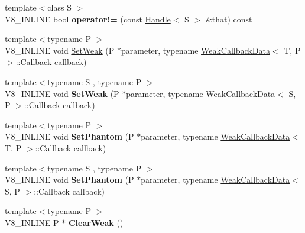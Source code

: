 \begin{DoxyCompactItemize}
\item 
\hypertarget{classv8_1_1PersistentBase_acc30195c1ee4e1f801cab267e6855fd3}{}{\footnotesize template$<$class S $>$ }\\V8\+\_\+\+I\+N\+L\+I\+N\+E bool {\bfseries operator!=} (const \hyperlink{classv8_1_1Handle}{Handle}$<$ S $>$ \&that) const \label{classv8_1_1PersistentBase_acc30195c1ee4e1f801cab267e6855fd3}

\item 
{\footnotesize template$<$typename P $>$ }\\V8\+\_\+\+I\+N\+L\+I\+N\+E void \hyperlink{classv8_1_1PersistentBase_a1fb3293eff7a66068de13d152f73f308}{Set\+Weak} (P $\ast$parameter, typename \hyperlink{classv8_1_1WeakCallbackData}{Weak\+Callback\+Data}$<$ T, P $>$\+::Callback callback)
\item 
\hypertarget{classv8_1_1PersistentBase_a297e0c410e9496318187853e07bf8406}{}{\footnotesize template$<$typename S , typename P $>$ }\\V8\+\_\+\+I\+N\+L\+I\+N\+E void {\bfseries Set\+Weak} (P $\ast$parameter, typename \hyperlink{classv8_1_1WeakCallbackData}{Weak\+Callback\+Data}$<$ S, P $>$\+::Callback callback)\label{classv8_1_1PersistentBase_a297e0c410e9496318187853e07bf8406}

\item 
\hypertarget{classv8_1_1PersistentBase_ab30d2f1468123f44bc9945c4f1743dbf}{}{\footnotesize template$<$typename P $>$ }\\V8\+\_\+\+I\+N\+L\+I\+N\+E void {\bfseries Set\+Phantom} (P $\ast$parameter, typename \hyperlink{classv8_1_1WeakCallbackData}{Weak\+Callback\+Data}$<$ T, P $>$\+::Callback callback)\label{classv8_1_1PersistentBase_ab30d2f1468123f44bc9945c4f1743dbf}

\item 
\hypertarget{classv8_1_1PersistentBase_a70f75731cb947f2a7c5c33fb2aef5618}{}{\footnotesize template$<$typename S , typename P $>$ }\\V8\+\_\+\+I\+N\+L\+I\+N\+E void {\bfseries Set\+Phantom} (P $\ast$parameter, typename \hyperlink{classv8_1_1WeakCallbackData}{Weak\+Callback\+Data}$<$ S, P $>$\+::Callback callback)\label{classv8_1_1PersistentBase_a70f75731cb947f2a7c5c33fb2aef5618}

\item 
\hypertarget{classv8_1_1PersistentBase_a444d27c00650e3663348024df08cb121}{}{\footnotesize template$<$typename P $>$ }\\V8\+\_\+\+I\+N\+L\+I\+N\+E P $\ast$ {\bfseries Clear\+Weak} ()\label{classv8_1_1PersistentBase_a444d27c00650e3663348024df08cb121}


\end{DoxyCompactItemize}
